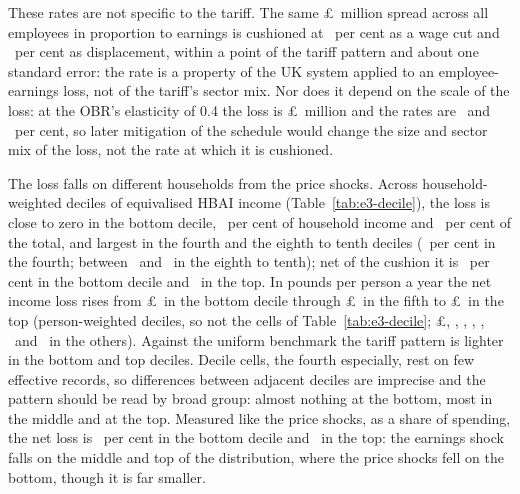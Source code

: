 These rates are not specific to the tariff. The same
\pounds\EThreeUnifGrossM\ million spread across all employees in
proportion to earnings is cushioned at \EThreeUnifWageRatePct\ per
cent as a wage cut and \EThreeUnifDispRatePct\ per cent as
displacement, within a point of the tariff pattern and about one
standard error: the rate is a property of the UK system applied to an
employee-earnings loss, not of the tariff's sector mix. Nor does it
depend on the scale of the loss: at the OBR's elasticity of 0.4 the
loss is \pounds\EThreeObrLowWageGrossM\ million and the rates are
\EThreeObrLowWageRatePct\ and \EThreeObrLowDispRatePct\ per cent, so
later mitigation of the schedule would change the size and sector mix
of the loss, not the rate at which it is cushioned.

The loss falls on different households from the price shocks. Across household-weighted deciles of equivalised
HBAI income (Table~\ref{tab:e3-decile}), the loss is close to zero in
the bottom decile, \EThreeDispSharePctDecOne\ per cent of household
income and \EThreeLossSharePctDecOne\ per cent of the total, and
largest in the fourth and the eighth to tenth deciles
(\EThreeDispSharePctDecFour\ per cent in the fourth; between
\EThreeDispSharePctDecTen\ and \EThreeDispSharePctDecNine\ in the
eighth to tenth); net of the cushion it is
\EThreeDispNetSharePctDecOne\ per cent in the bottom decile and
\EThreeDispNetSharePctDecTen\ in the top. In pounds per person a year
the net income loss rises from \pounds\EThreeDispDecGbpOne\ in the bottom decile
through \pounds\EThreeDispDecGbpFive\ in the fifth to
\pounds\EThreeDispDecGbpTen\ in the top (person-weighted deciles, so not the cells of
Table~\ref{tab:e3-decile};
\pounds\EThreeDispDecGbpTwo, \EThreeDispDecGbpThree,
\EThreeDispDecGbpFour, \EThreeDispDecGbpSix, \EThreeDispDecGbpSeven,
\EThreeDispDecGbpEight\ and \EThreeDispDecGbpNine\ in the others).
Against the uniform benchmark the tariff pattern is lighter in the
bottom and top deciles. Decile cells, the fourth especially, rest on
few effective records, so differences between adjacent deciles
are imprecise and the pattern should be read by broad group: almost
nothing at the bottom, most in the middle and at the top. Measured
like the price shocks, as a share of spending, the net loss is
\EThreeDispNetSpendSharePctDecOne\ per cent in the bottom decile and
\EThreeDispNetSpendSharePctDecTen\ in the top: the earnings shock
falls on the middle and top of the distribution, where the price
shocks fell on the bottom, though it is far smaller.

